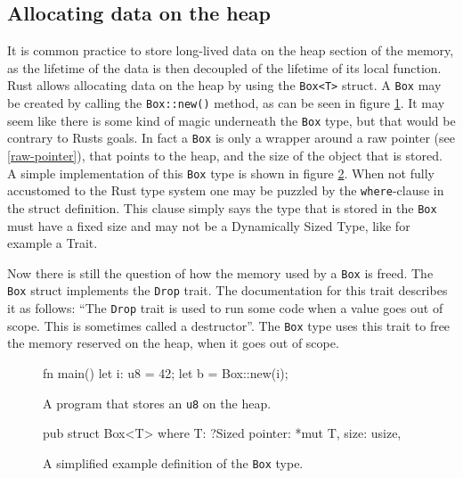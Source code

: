 \documentclass[twocolumn]{article}
\begin{document}
\subsection{Allocating data on the heap}
\label{box}
It is common practice to store long-lived data on the heap section of the memory, as the lifetime of the data is then decoupled of the lifetime of its local function.
Rust allows allocating data on the heap by using the \texttt{Box<T>} struct.
A \texttt{Box} may be created by calling the \texttt{Box::new()} method, as can be seen in figure \ref{box-example}.
It may seem like there is some kind of magic underneath the \texttt{Box} type, but that would be contrary to Rusts goals.
In fact a \texttt{Box} is only a wrapper around a raw pointer (see \ref{raw-pointer}), that points to the heap, and the size of the object that is stored.
A simple implementation of this \texttt{Box} type is shown in figure \ref{box-definition}.
When not fully accustomed to the Rust type system one may be puzzled by the \texttt{where}-clause in the struct definition.
This clause simply says the type that is stored in the \texttt{Box} must have a fixed size and may not be a Dynamically Sized Type\cite{BlogDST}, like for example a Trait.

Now there is still the question of how the memory used by a \texttt{Box} is freed.
The \texttt{Box} struct implements the \texttt{Drop} trait.
The documentation for this trait describes it as follows: ``The \texttt{Drop} trait is used to run some code when a value goes out of scope. This is sometimes called a destructor''\cite{RustDoc-Drop}.
The \texttt{Box} type uses this trait to free the memory reserved on the heap, when it goes out of scope.
\begin{figure}
\begin{rustcode}
fn main() {
    let i: u8 = 42;
    let b = Box::new(i);
}
\end{rustcode}
\vspace{-2em}
\caption{A program that stores an \texttt{u8} on the heap.}
\label{box-example}
\end{figure}
\begin{figure}
\begin{rustcode}
pub struct Box<T> where T: ?Sized {
    pointer: *mut T,
    size: usize,
}
\end{rustcode}
\vspace{-2em}
\caption{A simplified example definition of the \texttt{Box} type.}
\label{box-definition}
\end{figure}
\end{document}
